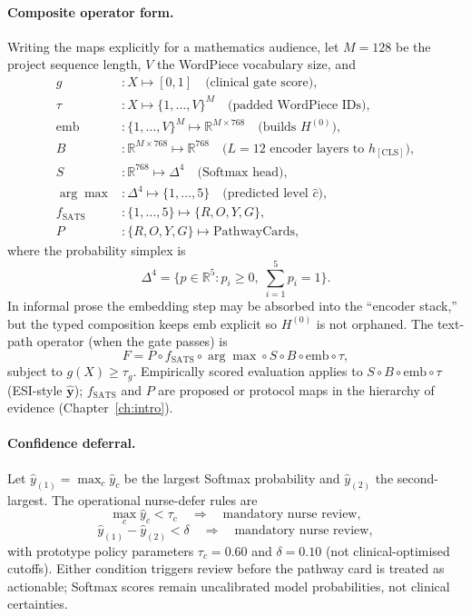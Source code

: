 \paragraph{Composite operator form.}
Writing the maps explicitly for a mathematics audience, let \(M=128\) be the project sequence length, \(V\) the WordPiece vocabulary size, and
\begin{align*}
  g &: X \mapsto [0,1]
    \quad\text{(clinical gate score)}, \\
  \tau &: X \mapsto \{1,\ldots,V\}^{M}
    \quad\text{(padded WordPiece IDs)}, \\
  \mathrm{emb} &: \{1,\ldots,V\}^{M} \mapsto \mathbb{R}^{M\times 768}
    \quad\text{(builds \(H^{(0)}\))}, \\
  B &: \mathbb{R}^{M\times 768} \mapsto \mathbb{R}^{768}
    \quad\text{(\(L=12\) encoder layers to \(h_{\mathrm{[CLS]}}\))}, \\
  S &: \mathbb{R}^{768} \mapsto \Delta^{4}
    \quad\text{(Softmax head)}, \\
  \arg\max &: \Delta^{4} \mapsto \{1,\ldots,5\}
    \quad\text{(predicted level \(\hat{c}\))}, \\
  f_{\mathrm{SATS}} &: \{1,\ldots,5\} \mapsto \{R,O,Y,G\}, \\
  P &: \{R,O,Y,G\} \mapsto \text{PathwayCards},
\end{align*}
where the probability simplex is
\[
  \Delta^{4}=\bigl\{p\in\mathbb{R}^{5}: p_i\ge 0,\; \sum_{i=1}^{5}p_i=1\bigr\}.
\]
In informal prose the embedding step may be absorbed into the ``encoder stack,'' but the typed composition keeps \(\mathrm{emb}\) explicit so \(H^{(0)}\) is not orphaned. The text-path operator (when the gate passes) is
\begin{equation}
  F = P \circ f_{\mathrm{SATS}} \circ \arg\max \circ S \circ B \circ \mathrm{emb} \circ \tau,
  \label{eq:composite-F}
\end{equation}
subject to \(g(X)\ge \tau_g\). Empirically scored evaluation applies to \(S\circ B\circ\mathrm{emb}\circ\tau\) (ESI-style \(\hat{\mathbf{y}}\)); \(f_{\mathrm{SATS}}\) and \(P\) are proposed or protocol maps in the hierarchy of evidence (Chapter~\ref{ch:intro}).

\paragraph{Confidence deferral.}
Let \(\hat{y}_{(1)}=\max_c\hat{y}_c\) be the largest Softmax probability and \(\hat{y}_{(2)}\) the second-largest. The operational nurse-defer rules are
\begin{equation}
  \max_c \hat{y}_c < \tau_c \quad\Rightarrow\quad \text{mandatory nurse review},
  \label{eq:tau-c}
\end{equation}
\begin{equation}
  \hat{y}_{(1)}-\hat{y}_{(2)} < \delta \quad\Rightarrow\quad \text{mandatory nurse review},
  \label{eq:margin-delta}
\end{equation}
with prototype policy parameters \(\tau_c=0.60\) and \(\delta=0.10\) (not clinical-optimised cutoffs). Either condition triggers review before the pathway card is treated as actionable; Softmax scores remain uncalibrated model probabilities, not clinical certainties.

